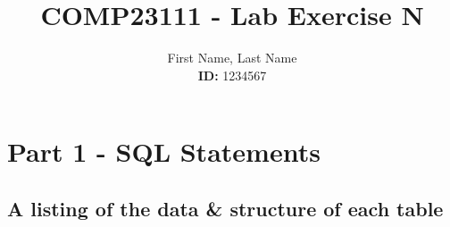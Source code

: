 \documentclass[11pt,a4paper]{article}
\begin{document}
\title{\textbf{COMP23111} - Lab Exercise N}

\author{First Name, Last Name \\ \textbf{ID:} 1234567} 


\maketitle
\thispagestyle{empty} %
\newpage %

\section{Part 1 - SQL Statements}

\subsection{A listing of the data \& structure of each table}
\end{document}
